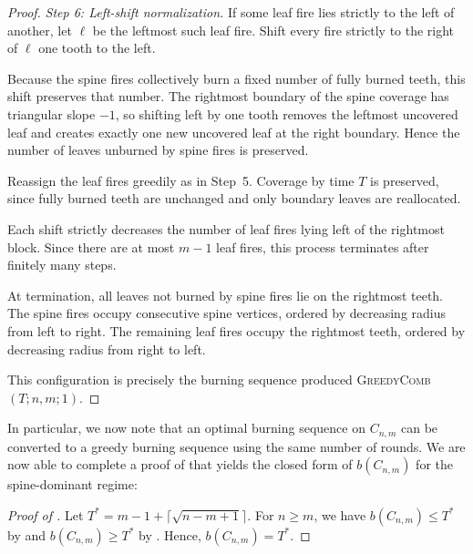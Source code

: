 \documentclass{article}
\begin{document}
\begin{proof}
\medskip
\noindent
\emph{Step 6: Left-shift normalization.}
If some leaf fire lies strictly to the left of another,
let $\ell$ be the leftmost such leaf fire.
Shift every fire strictly to the right of $\ell$
one tooth to the left.

Because the spine fires collectively burn
a fixed number of fully burned teeth,
this shift preserves that number.
The rightmost boundary of the spine coverage
has triangular slope $-1$,
so shifting left by one tooth removes the leftmost uncovered leaf
and creates exactly one new uncovered leaf at the right boundary.
Hence the number of leaves unburned by spine fires is preserved.

Reassign the leaf fires greedily as in Step~5.
Coverage by time $T$ is preserved,
since fully burned teeth are unchanged
and only boundary leaves are reallocated. 

Each shift strictly decreases
the number of leaf fires lying left of the rightmost block.
Since there are at most $m-1$ leaf fires,
this process terminates after finitely many steps.

\medskip
At termination,
all leaves not burned by spine fires
lie on the rightmost teeth.
The spine fires occupy consecutive spine vertices,
ordered by decreasing radius from left to right.
The remaining leaf fires occupy the rightmost teeth,
ordered by decreasing radius from right to left.

This configuration is precisely the burning sequence produced
\textsc{GreedyComb}$(T;n,m;1)$.
\end{proof}

In particular, we now note that an optimal burning sequence on $C_{n,m}$ can be converted to a greedy burning sequence using the same number of rounds. We are now able to complete a proof of  that yields the closed form of $b(C_{n,m})$ for the spine-dominant regime:

\begin{proof}[Proof of ]
    Let $T^* = m-1 + \lceil \sqrt{n-m + 1}\rceil$. For $n \ge m$, we have $b(C_{n,m}) \le T^*$ by  and $b(C_{n,m}) \ge T^*$ by . Hence, $b(C_{n,m}) = T^*$.
\end{proof}
\end{document}
